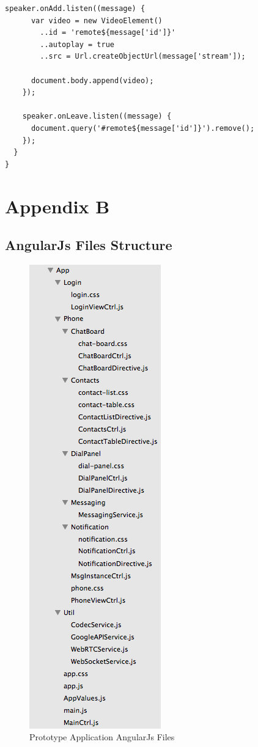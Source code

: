 \begin{appendices}
\begin{lstlisting}[caption={WebRTCCtrl in Dart application client},label={code:dart_webrtcctrl}]
    speaker.onAdd.listen((message) {
      var video = new VideoElement()
        ..id = 'remote${message['id']}'
        ..autoplay = true
        ..src = Url.createObjectUrl(message['stream']);

      document.body.append(video);
    });

    speaker.onLeave.listen((message) {
      document.query('#remote${message['id']}').remove();
    });
  }
}
\end{lstlisting}

\chapter{Appendix B}

\section{AngularJs Files Structure}
\label{code:angularjs_structure}

\begin{figure}
	\centering
    	\includegraphics[height=0.45\textheight,natwidth=610,natheight=642]{figs/angularjs_structure.png}
  	\caption{Prototype Application AngularJs Files}
  	\label{fig:angularjs_structure}
\end{figure}

\end{appendices}

